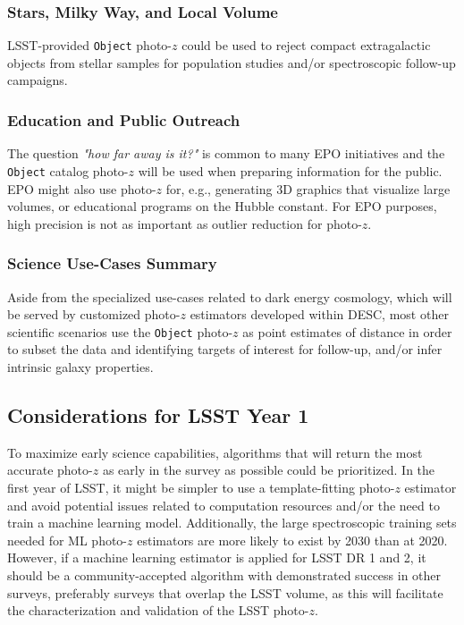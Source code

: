 \documentclass[DM,lsstdraft,toc]{lsstdoc}
\begin{document}
\subsubsection{Stars, Milky Way, and Local Volume}\label{sssec:use_sci_smwlv}
LSST-provided {\tt Object} photo-$z$ could be used to reject compact extragalactic objects from stellar samples for population studies and/or spectroscopic follow-up campaigns.

\subsubsection{Education and Public Outreach}\label{sssec:use_sci_epo}
The question {\it "how far away is it?"} is common to many EPO initiatives and the {\tt Object} catalog photo-$z$ will be used when preparing information for the public.
EPO might also use photo-$z$ for, e.g., generating 3D graphics that visualize large volumes, or educational programs on the Hubble constant.
For EPO purposes, high precision is not as important as outlier reduction for photo-$z$.


\subsubsection{Science Use-Cases Summary}\label{sssec:use_sci_sum}
Aside from the specialized use-cases related to dark energy cosmology, which will be served by customized photo-$z$ estimators developed within DESC, most other scientific scenarios use the {\tt Object} photo-$z$ as point estimates of distance in order to subset the data and identifying targets of interest for follow-up, and/or infer intrinsic galaxy properties.

\subsection{Considerations for LSST Year 1}\label{ssec:use_LOY1}

To maximize early science capabilities, algorithms that will return the most accurate photo-$z$ as early in the survey as possible could be prioritized.
In the first year of LSST, it might be simpler to use a template-fitting photo-$z$ estimator and avoid potential issues related to computation resources and/or the need to train a machine learning model.
Additionally, the large spectroscopic training sets needed for ML photo-$z$ estimators are more likely to exist by 2030 than at 2020.
However, if a machine learning estimator is applied for LSST DR 1 and 2, it should be a community-accepted algorithm with demonstrated success in other surveys, preferably surveys that overlap the LSST volume, as this will facilitate the characterization and validation of the LSST photo-$z$.
\end{document}
